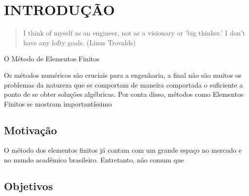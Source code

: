 

\chapter{INTRODUÇÃO}

\begin{quote}
    I think of myself as an engineer, not as a visionary or 'big thinker.' I don't have any lofty goals.
    (Linus Trovalds)  
\end{quote}

O Método de Elementos Finitos 

Os métodos numéricos são cruciais para a engenharia, a final não são muitos os problemas da natureza que se comportam de maneira comportada o suficiente a ponto de se obter soluções algébricas. Por conta disso, métodos como Elementos Finitos se mostram importantíssimo

\section{Motivação}

O método dos elementos finitos já contam com um grande espaço no mercado e no mundo acadêmico brasileiro. Entretanto, não comum que 

\section{Objetivos}
